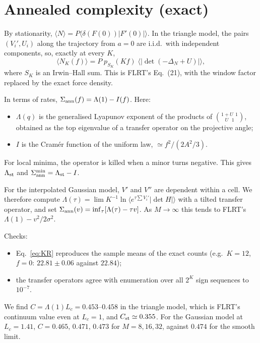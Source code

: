 \documentclass[10pt,a4paper]{article}
\newcommand{\Sann}{\Sigma_{\rm ann}}
\begin{document}
\section{Annealed complexity (exact)}

By stationarity, $\langle N\rangle=P\langle\delta(F(0))|F'(0)|\rangle$.
In the triangle model, the pairs $(V_i',U_i)$ along the trajectory from $a=0$ are i.i.d.\ with independent components, so, exactly at every $K$,
\begin{equation}
\langle N_K(f)\rangle=P\;p_{S_K}(Kf)\;\big\langle|\det(-\Delta_N+U)|\big\rangle ,
\label{eq:KR}
\end{equation}
where $S_K$ is an Irwin--Hall sum.
This is FLRT's Eq.~(21), with the window factor replaced by the exact force density.

In terms of rates, $\Sann(f)=\Lambda(1)-I(f)$. Here:
\begin{itemize}
\item $\Lambda(q)$ is the generalised Lyapunov exponent of the products of $\binom{1+U\ \ 1}{U\ \ \ 1}$, obtained as the top eigenvalue of a transfer operator on the projective angle;
\item $I$ is the Cramér function of the uniform law, $\simeq f^2/(2A^2/3)$.
\end{itemize}

For local minima, the operator is killed when a minor turns negative. This gives $\Lambda_{\rm st}$ and $\Sann^{\rm min}=\Lambda_{\rm st}-I$.

For the interpolated Gaussian model, $V'$ and $V''$ are dependent within a cell.
We therefore compute $\Lambda(\tau)=\lim K^{-1}\ln\langle e^{\tau\sum V_i'}|\det H|\rangle$ with a tilted transfer operator, and set $\Sann(v)=\inf_\tau[\Lambda(\tau)-\tau v]$.
As $M\to\infty$ this tends to FLRT's $\Lambda(1)-v^2/2\sigma^2$.

Checks:
\begin{itemize}
\item Eq.~\eqref{eq:KR} reproduces the sample means of the exact counts (e.g.\ $K=12$, $f=0$: $22.81\pm0.06$ against $22.84$);
\item the transfer operators agree with enumeration over all $2^K$ sign sequences to $10^{-7}$.
\end{itemize}

We find $C=\Lambda(1)L_c=0.453$--$0.458$ in the triangle model, which is FLRT's continuum value even at $L_c=1$, and $C_{\rm st}\simeq0.355$.
For the Gaussian model at $L_c=1.41$, $C=0.465,\,0.471,\,0.473$ for $M=8,16,32$, against $0.474$ for the smooth limit.
\end{document}
